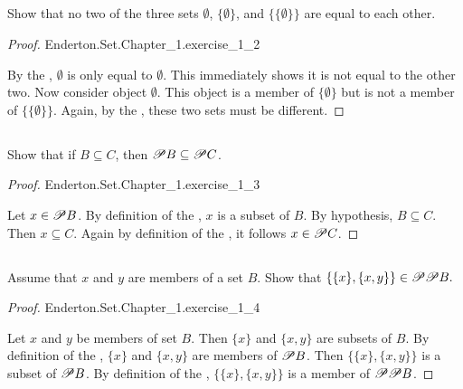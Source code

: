 \documentclass{report}
\begin{document}
\subsection{}%

Show that no two of the three sets $\emptyset$, $\{\emptyset\}$, and
  $\{\{\emptyset\}\}$ are equal to each other.

\begin{proof}

    {Enderton.Set.Chapter\_1.exercise\_1\_2}

  By the , $\emptyset$ is only equal to
    $\emptyset$.
  This immediately shows it is not equal to the other two.
  Now consider object $\emptyset$.
  This object is a member of $\{\emptyset\}$ but is not a member of
    $\{\{\emptyset\}\}$.
  Again, by the , these two sets must be
    different.

\end{proof}

\subsection{}%

Show that if $B \subseteq C$, then $\mathscr{P}B \subseteq \mathscr{P}C$.

\begin{proof}

    {Enderton.Set.Chapter\_1.exercise\_1\_3}

  Let $x \in \mathscr{P}B$.
  By definition of the , $x$ is a subset of $B$.
  By hypothesis, $B \subseteq C$.
  Then $x \subseteq C$.
  Again by definition of the , it follows
    $x \in \mathscr{P}C$.

\end{proof}

\subsection{}%

Assume that $x$ and $y$ are members of a set $B$.
Show that $\{\{x\}, \{x, y\}\} \in \mathscr{P}\mathscr{P}B.$

\begin{proof}

    {Enderton.Set.Chapter\_1.exercise\_1\_4}

  Let $x$ and $y$ be members of set $B$.
  Then $\{x\}$ and $\{x, y\}$ are subsets of $B$.
  By definition of the , $\{x\}$ and $\{x, y\}$ are
    members of $\mathscr{P}B$.
  Then $\{\{x\}, \{x, y\}\}$ is a subset of $\mathscr{P}B$.
  By definition of the , $\{\{x\}, \{x, y\}\}$ is a
    member of $\mathscr{P}\mathscr{P}B$.

\end{proof}
\end{document}
